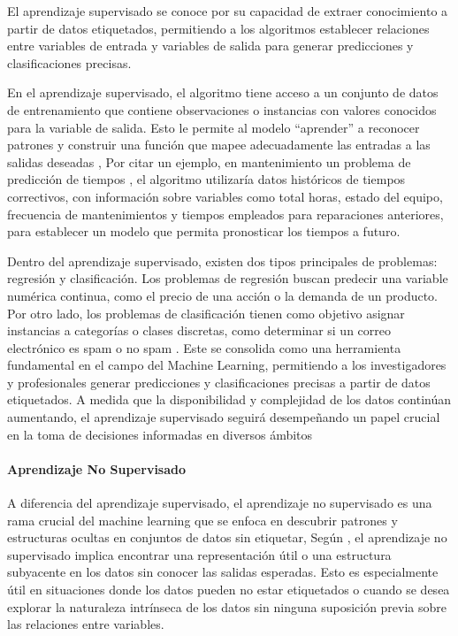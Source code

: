 \documentclass[
  11pt,
  bookmarksnumbered]{article}
\begin{document}
El aprendizaje supervisado se conoce por su capacidad de extraer conocimiento a partir de datos etiquetados, permitiendo a los algoritmos establecer relaciones entre variables de entrada y variables de salida para generar predicciones y clasificaciones precisas.

En el aprendizaje supervisado, el algoritmo tiene acceso a un conjunto de datos de entrenamiento que contiene observaciones o instancias con valores conocidos para la variable de salida.
Esto le permite al modelo ``aprender'' a reconocer patrones y construir una función que mapee adecuadamente las entradas a las salidas deseadas \textcite{Hastie2009}, Por citar un ejemplo, en mantenimiento un problema de predicción de tiempos , el algoritmo utilizaría datos históricos de tiempos correctivos, con información sobre variables como total horas, estado del equipo, frecuencia de mantenimientos y tiempos empleados para reparaciones anteriores, para establecer un modelo que permita pronosticar los tiempos a futuro.

Dentro del aprendizaje supervisado, existen dos tipos principales de problemas: regresión y clasificación.
Los problemas de regresión buscan predecir una variable numérica continua, como el precio de una acción o la demanda de un producto.
Por otro lado, los problemas de clasificación tienen como objetivo asignar instancias a categorías o clases discretas, como determinar si un correo electrónico es spam o no spam \textcite{Witten2016}.
Este se consolida como una herramienta fundamental en el campo del Machine Learning, permitiendo a los investigadores y profesionales generar predicciones y clasificaciones precisas a partir de datos etiquetados.
A medida que la disponibilidad y complejidad de los datos continúan aumentando, el aprendizaje supervisado seguirá desempeñando un papel crucial en la toma de decisiones informadas en diversos ámbitos

\hypertarget{aprendizaje-no-supervisado}{%
\paragraph{Aprendizaje No Supervisado}\label{aprendizaje-no-supervisado}}

A diferencia del aprendizaje supervisado, el aprendizaje no supervisado es una rama crucial del machine learning que se enfoca en descubrir patrones y estructuras ocultas en conjuntos de datos sin etiquetar, Según \textcite{Bishop2006}, el aprendizaje no supervisado implica encontrar una representación útil o una estructura subyacente en los datos sin conocer las salidas esperadas.
Esto es especialmente útil en situaciones donde los datos pueden no estar etiquetados o cuando se desea explorar la naturaleza intrínseca de los datos sin ninguna suposición previa sobre las relaciones entre variables.
\end{document}

